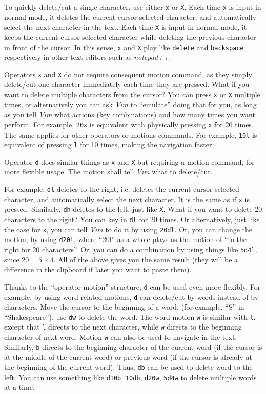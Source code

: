 To quickly delete/cut a single character, use either \verb|x| or \verb|X|. Each time \verb|x| is input in normal mode, it deletes the current cursor selected character, and automatically select the next character in the text. Each time \verb|X| is input in normal mode, it keeps the current cursor selected character while deleting the previous character in front of the cursor. In this sense, \verb|x| and \verb|X| play like \verb|delete| and \verb|backspace| respectively in other text editors such as \textit{notepad++}.

Operators \verb|x| and \verb|X| do not require consequent motion command, as they simply delete/cut one character immediately each time they are pressed. What if you want to delete multiple characters from the cursor? You can press \verb|x| or \verb|X| multiple times, or alternatively you can ask \textit{Vim} to ``emulate'' doing that for you, as long as you tell \textit{Vim} what actions (key combinations) and how many times you want perform. For example, \verb|20x| is equivalent with physically pressing \verb|x| for 20 times. The same applies for other operators or motions commands. For example, \verb|10l| is equivalent of pressing \verb|l| for 10 times, making the navigation faster.

Operator \verb|d| does similar things as \verb|x| and \verb|X| but requiring a motion command, for more flexible usage. The motion shall tell \textit{Vim} what to delete/cut.

For example, \verb|dl| deletes to the right, i.e. deletes the current cursor selected character, and automatically select the next character. It is the same as if \verb|x| is pressed. Similarly, \verb|dh| deletes  to the left, just like \verb|X|. What if you want to delete 20 characters to the right? You can key in \verb|dl| for 20 times. Or alternatively, just like the case for \verb|x|, you can tell \textit{Vim} to do it by using \verb|20dl|. Or, you can change the motion, by using \verb|d20l|, where ``20l'' as a whole plays as the motion of ``to the right for 20 characters''. Or, you can do a combination by using things like \verb|5d4l|, since $20=5\times 4$. All of the above gives you the same result (they will be a difference in the clipboard if later you want to paste them).

Thanks to the ``operator-motion'' structure, \verb|d| can be used even more flexibly. For example, by using word-related motions, \verb|d| can delete/cut by words instead of by characters. Move the cursor to the beginning of a word, (for example, ``S'' in ``Shakespeare''), use \verb|dw| to delete the word. The word motion \verb|w| is similar with \verb|l|, except that \verb|l| directs to the next character, while \verb|w| directs to the beginning character of next word. Motion \verb|w| can also be used to navigate in the text. Similarly, \verb|b| directs to the beginning character of the current word (if the cursor is at the middle of the current word) or previous word (if the cursor is already at the beginning of the current word). Thus, \verb|db| can be used to delete word to the left. You can use something like \verb|d10b|, \verb|10db|, \verb|d20w|, \verb|5d4w| to delete multiple words at a time.


